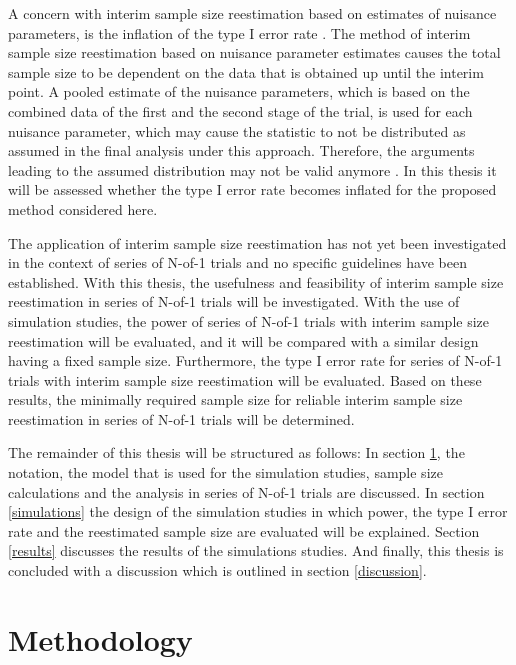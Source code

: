 \documentclass[AMA,STIX1COL,]{WileyNJD-v2}
\begin{document}
A concern with interim sample size reestimation based on estimates of nuisance parameters, is the inflation of the type I error rate \citep{kieser2000, wittes1990, birkett1994}. The method of interim sample size reestimation based on nuisance parameter estimates causes the total sample size to be dependent on the data that is obtained up until the interim point. A pooled estimate of the nuisance parameters, which is based on the combined data of the first and the second stage of the trial, is used for each nuisance parameter, which may cause the statistic to not be distributed as assumed in the final analysis under this approach. Therefore, the arguments leading to the assumed distribution may not be valid anymore \citep{kieser2000}. In this thesis it will be assessed whether the type I error rate becomes inflated for the proposed method considered here.

The application of interim sample size reestimation has not yet been investigated in the context of series of N-of-1 trials and no specific guidelines have been established. With this thesis, the usefulness and feasibility of interim sample size reestimation in series of N-of-1 trials will be investigated. With the use of simulation studies, the power of series of N-of-1 trials with interim sample size reestimation will be evaluated, and it will be compared with a similar design having a fixed sample size. Furthermore, the type I error rate for series of N-of-1 trials with interim sample size reestimation will be evaluated. Based on these results, the minimally required sample size for reliable interim sample size reestimation in series of N-of-1 trials will be determined.

The remainder of this thesis will be structured as follows: In section \ref{methods}, the notation, the model that is used for the simulation studies, sample size calculations and the analysis in series of N-of-1 trials are discussed. In section \ref{simulations} the design of the simulation studies in which power, the type I error rate and the reestimated sample size are evaluated will be explained. Section \ref{results} discusses the results of the simulations studies. And finally, this thesis is concluded with a discussion which is outlined in section \ref{discussion}.

\hypertarget{methods}{%
\section{Methodology}\label{methods}}
\end{document}
